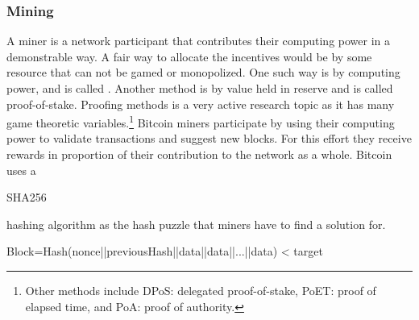 \subsubsection*{Mining}
A miner is a network participant that contributes their computing power in a demonstrable way. A fair way to allocate the incentives would be by some resource that can not be gamed or monopolized. One such way is by computing power, and is called . Another method is by value held in reserve and is called proof-of-stake. Proofing methods is a very active research topic as it has many game theoretic variables.\footnote{Other methods include DPoS: delegated proof-of-stake, PoET: proof of elapsed time, and PoA: proof of authority.} Bitcoin miners participate by using their computing power to validate transactions and suggest new blocks. For this effort they receive rewards in proportion of their contribution to the network as a whole. Bitcoin uses a \begin{code}SHA256\end{code} hashing algorithm as the hash puzzle that miners have to find a solution for.
\begin{center}
\begin{code}
	Block=Hash(nonce||previousHash||data||data||...||data) < target
\end{code}
\end{center}

